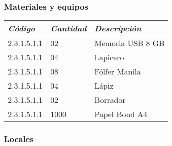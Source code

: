     \subsubsection{Materiales y equipos}
            \begin{table}[h!]
                \centering
                \begin{tabular}{|p{3cm}|p{2cm}|p{5cm}|} \hline
                    
                
                \textit{{\bf{Código}}} &
                \textit{{\bf{Cantidad}}} &
                \textit{{\bf{Descripción}}}
                \\ \hline

                2.3.1.5.1.1 &
                02 &
                Memoria USB 8 GB
                \\ \hline

                2.3.1.5.1.1 &
                04 &
                Lapicero
                \\ \hline

                2.3.1.5.1.1 &
                08 &
                Fólfer Manila
                \\ \hline

                2.3.1.5.1.1 &
                04 &
                Lápiz
                \\ \hline

                2.3.1.5.1.1 &
                02 &
                Borrador
                \\ \hline

                2.3.1.5.1.1 &
                1000 &
                Papel Bond A4
                \\ \hline

                \end{tabular}
            \end{table}
    \subsubsection{Locales}

